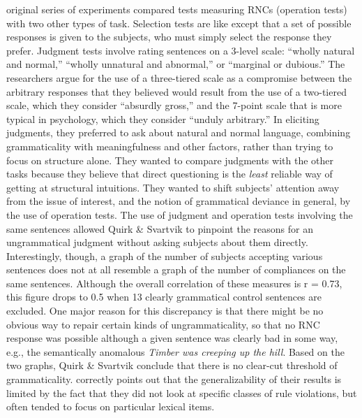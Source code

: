  original series of experiments compared tests measuring RNCs (operation tests) with two other types of task. Selection tests are like  except that a set of possible responses is given to the subjects, who must simply select the response they prefer. Judgment tests involve rating sentences on a 3-level scale: ``wholly natural and normal,'' ``wholly unnatural and abnormal,'' or ``marginal or dubious.'' The researchers argue for the use of a three-tiered scale as a compromise between the arbitrary responses that they believed would result from the use of a two-tiered scale, which they consider ``absurdly gross,'' and the 7-point scale that is more typical in psychology, which they consider ``unduly arbitrary.'' In eliciting judgments, they preferred to ask about natural and normal language, combining grammaticality with meaningfulness and other factors, rather than trying to focus on structure alone. They wanted to compare judgments with the other tasks because they believe that direct questioning is the \textit{least} reliable way of getting at structural intuitions. They wanted to shift subjects' attention away from the issue of interest, and the notion of grammatical deviance in general, by the use of operation tests. The use of judgment and operation tests involving the same sentences allowed Quirk \& Svartvik to pinpoint the reasons for an ungrammatical judgment without asking subjects about them directly. Interestingly, though, a graph of the number of subjects accepting various sentences does not at all resemble a graph of the number of compliances on the
same sentences. Although the overall correlation of these measures is r = 0.73, this figure drops to 0.5 when 13 clearly grammatical control sentences are excluded. One major reason for this discrepancy is that there might be no obvious way to repair certain kinds of ungrammaticality, so that no RNC response was possible although a given sentence was clearly bad in some way, e.g., the semantically anomalous \textit{Timber was creeping up the hill}. Based on the two graphs, Quirk \& Svartvik conclude that there is no clear-cut threshold of grammaticality. \citet{Stolz1969} correctly points out that the generalizability of their results is limited by the fact that they did not look at specific classes of rule violations, but often tended to focus on particular lexical items.

